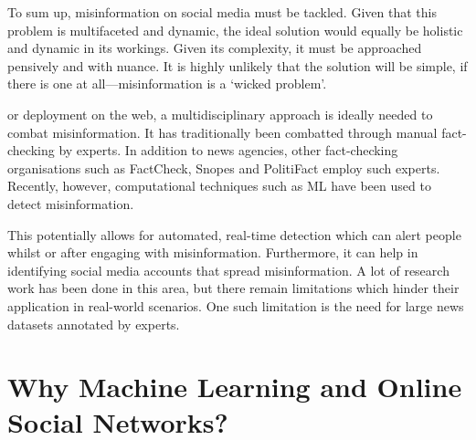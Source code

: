 To sum up, misinformation on social media must be tackled. Given that this problem is multifaceted and dynamic, the ideal solution would equally be holistic and dynamic in its workings. Given its complexity, it must be approached pensively and with nuance. It is highly unlikely that the solution will be simple, if there is one at all—misinformation is a `wicked problem'.

 or deployment on the web, a multidisciplinary approach is ideally needed to combat misinformation. It has traditionally been combatted through manual fact-checking by experts. In addition to news agencies, other fact-checking organisations such as FactCheck, Snopes and PolitiFact employ such experts. Recently, however, computational techniques such as \ac{ML} have been used to detect misinformation.

This potentially allows for automated, real-time detection which can alert people whilst or after engaging with misinformation. Furthermore, it can help in identifying social media accounts that spread misinformation. A lot of research work has been done in this area, but there remain limitations which hinder their application in real-world scenarios. One such limitation is the need for large news datasets annotated by experts.

\section{Why Machine Learning and Online Social Networks?}
\label{ssec:1-whyml}

